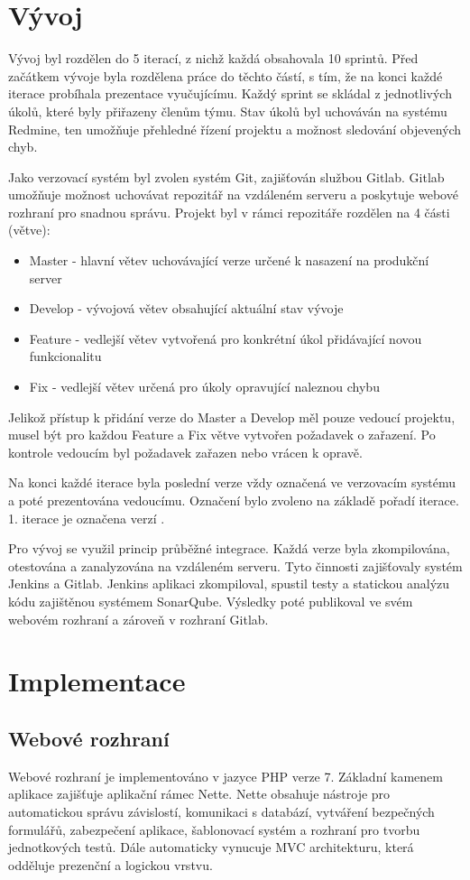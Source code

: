 \documentclass[thesis=B,czech]{FITthesis}[2012/06/26]
\begin{document}
\section{Vývoj}
Vývoj byl rozdělen do 5 iterací, z nichž každá obsahovala 10 sprintů. Před začátkem vývoje byla rozdělena práce do těchto částí, 
s tím, že na konci každé iterace probíhala prezentace vyučujícímu. Každý sprint se skládal z jednotlivých
úkolů, které byly přiřazeny členům týmu. Stav úkolů byl uchováván na systému Redmine, ten umožňuje přehledné řízení projektu
a možnost sledování objevených chyb.
\par
Jako verzovací systém byl zvolen systém Git, zajišťován službou Gitlab. Gitlab umožňuje možnost uchovávat
repozitář na vzdáleném serveru a poskytuje webové rozhraní pro snadnou správu. Projekt byl v rámci repozitáře rozdělen na 4 části (větve):
\begin{itemize}
\item Master - hlavní větev uchovávající verze určené k nasazení na produkční server
\item Develop - vývojová větev obsahující aktuální stav vývoje
\item Feature - vedlejší větev vytvořená pro konkrétní úkol přidávající novou funkcionalitu
\item Fix - vedlejší větev určená pro úkoly opravující naleznou chybu
\end{itemize}
Jelikož přístup k přidání verze do Master a Develop měl pouze vedoucí projektu, musel být pro každou Feature a Fix větve
vytvořen požadavek o zařazení. Po kontrole vedoucím byl požadavek zařazen nebo vrácen k opravě.
\par
Na konci každé iterace byla poslední verze vždy označená ve verzovacím systému a poté prezentována vedoucímu.
Označení bylo zvoleno na základě pořadí iterace. 1. iterace je označena verzí .
\par
Pro vývoj se využil princip průběžné integrace. Každá verze byla zkompilována, otestována a zanalyzována na vzdáleném serveru.
Tyto činnosti zajišťovaly systém Jenkins a Gitlab. Jenkins aplikaci zkompiloval, spustil testy a statickou analýzu kódu 
zajištěnou systémem SonarQube. Výsledky poté publikoval ve svém webovém rozhraní a zároveň v rozhraní Gitlab.  
\section{Implementace}


\subsection{Webové rozhraní}
Webové rozhraní je implementováno v jazyce PHP verze 7. Základní kamenem aplikace zajišťuje aplikační rámec Nette. Nette
obsahuje nástroje pro automatickou správu závislostí, komunikaci s databází, vytváření bezpečných formulářů, zabezpečení
aplikace, šablonovací systém a rozhraní pro tvorbu jednotkových testů. Dále automaticky vynucuje MVC architekturu, která odděluje
prezenční a logickou vrstvu.
\end{document}
